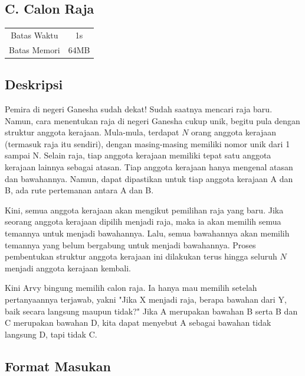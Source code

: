 \documentclass{article}
\begin{document}
\begin{center}
    \section*{C. Calon Raja} %

    \begin{tabular}{ | c c | }
        \hline
        Batas Waktu  & 1s \\    %
        Batas Memori & 64MB \\  %
        \hline
    \end{tabular}
\end{center}

\subsection*{Deskripsi}

Pemira di negeri Ganesha sudah dekat!
Sudah saatnya mencari raja baru.
Namun, cara menentukan raja di negeri Ganesha cukup unik, begitu pula dengan struktur anggota kerajaan.
Mula-mula, terdapat $N$ orang anggota kerajaan (termasuk raja itu sendiri), dengan masing-masing memiliki nomor unik dari 1 sampai N.
Selain raja, tiap anggota kerajaan memiliki tepat satu anggota kerajaan lainnya sebagai atasan.
Tiap anggota kerajaan hanya mengenal atasan dan bawahannya.
Namun, dapat dipastikan untuk tiap anggota kerajaan A dan B, ada rute pertemanan antara A dan B.

Kini, semua anggota kerajaan akan mengikut pemilihan raja yang baru.
Jika seorang anggota kerajaan dipilih menjadi raja, maka ia akan memilih semua temannya untuk menjadi bawahannya.
Lalu, semua bawahannya akan memilih temannya yang belum bergabung untuk menjadi bawahannya.
Proses pembentukan struktur anggota kerajaan ini dilakukan terus hingga seluruh $N$ menjadi anggota kerajaan kembali.

Kini Arvy bingung memilih calon raja.
Ia hanya mau memilih setelah pertanyaannya terjawab, yakni "Jika X menjadi raja, berapa bawahan dari Y, baik secara langsung maupun tidak?"
Jika A merupakan bawahan B serta B dan C merupakan bawahan D, kita dapat menyebut A sebagai bawahan tidak langsung D, tapi tidak C.

\subsection*{Format Masukan}
\end{document}
